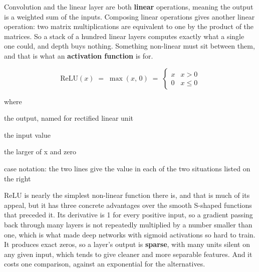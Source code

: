 Convolution and the linear layer are both \textbf{linear} operations, meaning the output is a weighted sum of the inputs. Composing linear operations gives another linear operation: two matrix multiplications are equivalent to one by the product of the matrices. So a stack of a hundred linear layers computes exactly what a single one could, and depth buys nothing. Something non-linear must sit between them, and that is what an \textbf{activation function} is for.


\begin{equation}
\mathrm{ReLU}(x) \;=\; \max(x,\,0) \;=\; \begin{cases} x & x > 0 \\ 0 & x \le 0 \end{cases}
\end{equation}

\noindent where
\begin{description}[leftmargin=2.4em,style=nextline,font=\normalfont\ttfamily]\setlength\itemsep{1pt}
  \item[{$\mathrm{ReLU}(x)$}] \normalfont the output, named for rectified linear unit
  \item[{$x$}] \normalfont the input value
  \item[{$\max(x,0)$}] \normalfont the larger of x and zero
  \item[{$\begin{cases}\end{cases}$}] \normalfont case notation: the two lines give the value in each of the two situations listed on the right
\end{description}

ReLU is nearly the simplest non-linear function there is, and that is much of its appeal, but it has three concrete advantages over the smooth S-shaped functions that preceded it. Its derivative is 1 for every positive input, so a gradient passing back through many layers is not repeatedly multiplied by a number smaller than one, which is what made deep networks with sigmoid activations so hard to train. It produces exact zeros, so a layer's output is \textbf{sparse}, with many units silent on any given input, which tends to give cleaner and more separable features. And it costs one comparison, against an exponential for the alternatives.


